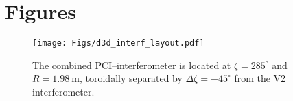 \chapter{Figures}

\begin{figure}[ht]
\centering
\texttt{[image: Figs/d3d\_interf\_layout.pdf]}
\caption{%
  The combined PCI--interferometer is located at
  $\zeta = 285^{\circ}$ and $R = \SI{1.98}{\meter}$,
  toroidally separated by $\Delta \zeta = -45^{\circ}$
  from the V2 interferometer.}
\label{fig:d3d_interf_layout}
\end{figure}

\clearpage
\newpage
